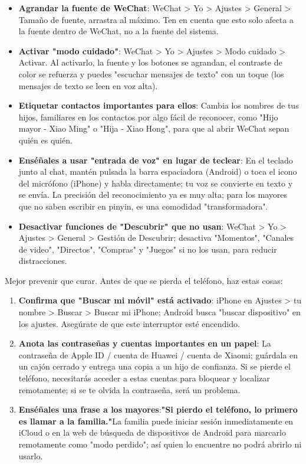 \begin{itemize}
  \item \textbf{Agrandar la fuente de WeChat}: WeChat > Yo > Ajustes > General > Tamaño de fuente, arrastra al máximo. Ten en cuenta que esto solo afecta a la fuente dentro de WeChat, no a la fuente del sistema.
  \item \textbf{Activar "modo cuidado"}: WeChat > Yo > Ajustes > Modo cuidado > Activar. Al activarlo, la fuente y los botones se agrandan, el contraste de color se refuerza y puedes "escuchar mensajes de texto" con un toque (los mensajes de texto se leen en voz alta).
  \item \textbf{Etiquetar contactos importantes para ellos}: Cambia los nombres de tus hijos, familiares en los contactos por algo fácil de reconocer, como "Hijo mayor - Xiao Ming" o "Hija - Xiao Hong", para que al abrir WeChat sepan quién es quién.
  \item \textbf{Enséñales a usar "entrada de voz" en lugar de teclear}: En el teclado junto al chat, mantén pulsada la barra espaciadora (Android) o toca el icono del micrófono (iPhone) y habla directamente; tu voz se convierte en texto y se envía. La precisión del reconocimiento ya es muy alta; para los mayores que no saben escribir en pinyin, es una comodidad "transformadora".
  \item \textbf{Desactivar funciones de "Descubrir" que no usan}: WeChat > Yo > Ajustes > General > Gestión de Descubrir; desactiva "Momentos", "Canales de video", "Directos", "Compras" y "Juegos" si no los usan, para reducir distracciones.
\end{itemize}


Mejor prevenir que curar. Antes de que se pierda el teléfono, haz estas cosas:

\begin{enumerate}
  \item \textbf{Confirma que "Buscar mi móvil" está activado}: iPhone en Ajustes > tu nombre > Buscar > Buscar mi iPhone; Android busca "buscar dispositivo" en los ajustes. Asegúrate de que este interruptor esté encendido.
  \item \textbf{Anota las contraseñas y cuentas importantes en un papel}: La contraseña de Apple ID / cuenta de Huawei / cuenta de Xiaomi; guárdala en un cajón cerrado y entrega una copia a un hijo de confianza. Si se pierde el teléfono, necesitarás acceder a estas cuentas para bloquear y localizar remotamente; si se te olvida la contraseña, será un problema.
  \item \textbf{Enséñales una frase a los mayores}:\textbf{"Si pierdo el teléfono, lo primero es llamar a la familia."}La familia puede iniciar sesión inmediatamente en iCloud o en la web de búsqueda de dispositivos de Android para marcarlo remotamente como "modo perdido"; así quien lo encuentre no podrá abrirlo ni usarlo.
\end{enumerate}

